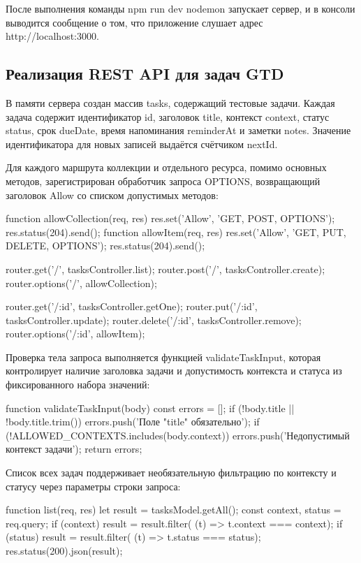 \documentclass{stp}
\begin{document}
После выполнения команды npm run dev nodemon
запускает сервер, и в консоли выводится сообщение о том, что
приложение слушает адрес http://localhost:3000.

\subsection{Реализация REST API для задач GTD}

В памяти сервера создан массив tasks, содержащий тестовые
задачи. Каждая задача содержит идентификатор id, заголовок
title, контекст context, статус status,
срок dueDate, время напоминания reminderAt и
заметки notes. Значение идентификатора для новых записей
выдаётся счётчиком nextId.

Для каждого маршрута коллекции и отдельного ресурса, помимо основных
методов, зарегистрирован обработчик запроса OPTIONS, возвращающий
заголовок Allow со списком допустимых методов:

\begin{stplisting}
function allowCollection(req, res) {
  res.set('Allow', 'GET, POST, OPTIONS');
  res.status(204).send();
}
function allowItem(req, res) {
  res.set('Allow', 'GET, PUT, DELETE, OPTIONS');
  res.status(204).send();
}

router.get('/', tasksController.list);
router.post('/', tasksController.create);
router.options('/', allowCollection);

router.get('/:id', tasksController.getOne);
router.put('/:id', tasksController.update);
router.delete('/:id', tasksController.remove);
router.options('/:id', allowItem);
\end{stplisting}

Проверка тела запроса выполняется функцией validateTaskInput,
которая контролирует наличие заголовка задачи и допустимость
контекста и статуса из фиксированного набора значений:

\begin{stplisting}
function validateTaskInput(body) {
  const errors = [];
  if (!body.title || !body.title.trim()) {
    errors.push('Поле "title" обязательно');
  }
  if (!ALLOWED_CONTEXTS.includes(body.context)) {
    errors.push('Недопустимый контекст задачи');
  }
  return errors;
}
\end{stplisting}

Список всех задач поддерживает необязательную фильтрацию по
контексту и статусу через параметры строки запроса:

\begin{stplisting}
function list(req, res) {
  let result = tasksModel.getAll();
  const { context, status } = req.query;
  if (context) {
    result = result.filter(
      (t) => t.context === context);
  }
  if (status) {
    result = result.filter(
      (t) => t.status === status);
  }
  res.status(200).json(result);
}
\end{stplisting}
\end{document}
